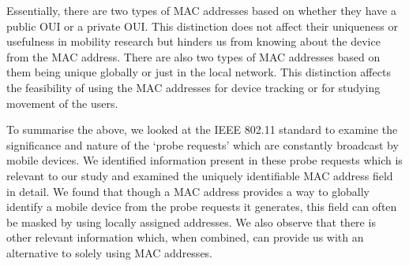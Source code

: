 Essentially, there are two types of MAC addresses based on whether they have a public OUI or a private OUI.
This distinction does not affect their uniqueness or usefulness in mobility research but hinders us from knowing about the device from the MAC address.
There are also two types of MAC addresses based on them being unique globally or just in the local network.
This distinction affects the feasibility of using the MAC addresses for device tracking or for studying movement of the users.

To summarise the above, we looked at the IEEE 802.11 standard to examine the significance and nature of the `probe requests' which are constantly broadcast by mobile devices.
We identified information present in these probe requests which is relevant to our study and examined the uniquely identifiable MAC address field in detail.
We found that though a MAC address provides a way to globally identify a mobile device from the probe requests it generates, this field can often be masked by using locally assigned addresses.
We also observe that there is other relevant information which, when combined, can provide us with an alternative to solely using MAC addresses.








